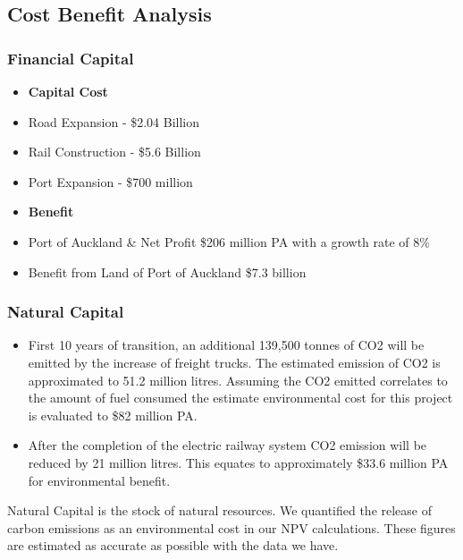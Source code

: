 \subsection*{Cost Benefit Analysis}
    \subsubsection*{Financial Capital}
        \begin{itemize}[noitemsep]
            \item[] \textbf{Capital Cost}
            \item Road Expansion  -  \$2.04 Billion
            \item Rail Construction - \$5.6 Billion
            \item Port Expansion - \$700 million
            \item[] \textbf{Benefit}
            \item Port of Auckland \& Net Profit \$206 million PA with a growth rate of 8\%
            \item Benefit from Land of Port of Auckland \$7.3 billion
        \end{itemize}
    \subsubsection*{Natural Capital}
        \begin{itemize}[noitemsep]
            \item First 10 years of transition, an additional 139,500 tonnes of CO2 will be emitted by the increase of freight trucks. The estimated emission of CO2 is approximated to 51.2 million litres. Assuming the CO2 emitted correlates to the amount of fuel consumed the estimate environmental cost for this project is evaluated to \$82 million PA.
            \item After the completion of the electric railway system CO2 emission will be reduced by 21 million litres. This equates to approximately \$33.6 million PA for environmental benefit.
        \end{itemize}
        Natural Capital is the stock of natural resources. We quantified the release of carbon emissions as an environmental cost in our NPV calculations. These figures are estimated as accurate as possible with the data we have.
